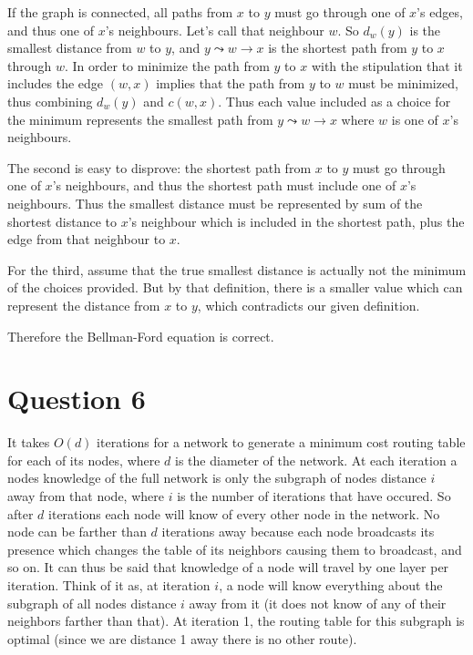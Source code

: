 \documentclass[12pt]{article}
\begin{document}
If the graph is connected, all paths from $x$ to $y$ must go through one of $x$’s edges, and thus one of $x$’s neighbours. Let’s call that neighbour $w$. So $d_w(y)$ is the smallest distance from $w$ to $y$, and $y \leadsto w \to x$ is the shortest path from $y$ to $x$ through $w$. In order to minimize the path from $y$ to $x$ with the stipulation that it includes the edge $(w, x)$ implies that the path from $y$ to $w$ must be minimized, thus combining $d_w(y)$ and $c(w, x)$. Thus each value included as a choice for the minimum represents the smallest path from $y \leadsto w \to x$ where $w$ is one of $x$’s neighbours.

The second is easy to disprove: the shortest path from $x$ to $y$ must go through one of $x$’s neighbours, and thus the shortest path must include one of $x$’s neighbours. Thus the smallest distance must be represented by sum of the shortest distance to $x$’s neighbour which is included in the shortest path, plus the edge from that neighbour to $x$.

For the third, assume that the true smallest distance is actually not the minimum of the choices provided. But by that definition, there is a smaller value which can represent the distance from $x$ to $y$, which contradicts our given definition.

Therefore the Bellman-Ford equation is correct.

\section*{Question 6}
It takes $O(d)$ iterations for a network to generate a minimum cost routing table for each of its nodes, where $d$ is the diameter of the network. At each iteration a nodes knowledge of the full network is only the subgraph of nodes distance $i$ away from that node, where $i$ is the number of iterations that have occured. So after $d$ iterations each node will know of every other node in the network. No node can be farther than $d$ iterations away because each node broadcasts its presence which changes the table of its neighbors causing them to broadcast, and so on. It can thus be said that knowledge of a node will travel by one layer per iteration. Think of it as, at iteration $i$, a node will know everything about the subgraph of all nodes distance $i$ away from it (it does not know of any of their neighbors farther than that). At iteration 1, the routing table for this subgraph is optimal (since we are distance 1 away there is no other route).
\end{document}
